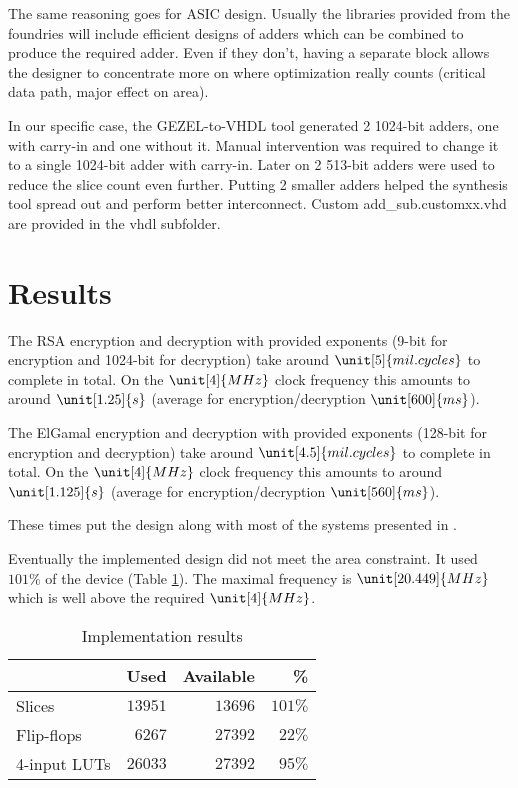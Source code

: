 \documentclass[a4paper, 12pt]{article}
\begin{document}
The same reasoning goes for ASIC design. Usually the libraries
provided from the foundries will include efficient designs of adders
which can be combined to produce the required adder. Even if they
don't, having a separate block allows the designer to concentrate more
on where optimization really counts (critical data path, major effect
on area).

In our specific case, the GEZEL-to-VHDL tool generated 2 1024-bit
adders, one with carry-in and one without it. Manual intervention was
required to change it to a single 1024-bit adder with carry-in. Later
on 2 513-bit adders were used to reduce the slice count even further.
Putting 2 smaller adders helped the synthesis tool spread out and
perform better interconnect.
Custom add\_sub.customxx.vhd are provided in the vhdl subfolder.

\section{Results}

The RSA encryption and decryption with provided exponents (9-bit for encryption and 1024-bit for decryption) take around $\unit[5]{mil. cycles}$ to complete in total. On the $\unit[4]{MHz}$ clock frequency this amounts to around $\unit[1.25]{s}$ (average for encryption/decryption $\unit[600]{ms}$).

The ElGamal encryption and decryption with provided exponents (128-bit for encryption and decryption) take around $\unit[4.5]{mil. cycles}$ to complete in total. On the $\unit[4]{MHz}$ clock frequency this amounts to around $\unit[1.125]{s}$ (average for encryption/decryption $\unit[560]{ms}$).

These times put the design along with most of the systems presented in \cite{smartcard_crypto_coprocs, smartcard_crypto_coprocs2}.

Eventually the implemented design did not meet the area constraint. It
used $101\%$ of the device (Table \ref{tab:results}). The maximal
frequency is $\unit[20.449]{MHz}$ which is well above the required
$\unit[4]{MHz}$.

\begin{table}[hbt!]
  \centering
  \begin{tabular}[hbt!]{l|r|r|r}
                 & Used  & Available & \% \\
    \hline
    Slices       & $13951$ &     $13696$ & $101\%$ \\
    Flip-flops   &  $6267$ &     $27392$ &  $22\%$ \\
    4-input LUTs & $26033$ &     $27392$ &  $95\%$
  \end{tabular}
  \caption{Implementation results}
  \label{tab:results}
\end{table}
\end{document}
